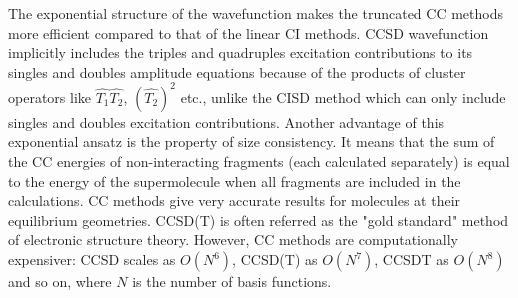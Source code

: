 The exponential structure of the wavefunction makes the truncated CC methods more efficient 
compared to that of the linear CI methods. CCSD wavefunction implicitly includes the triples
and quadruples excitation contributions to its singles and doubles amplitude equations because 
of the products of cluster operators like $\hat{T_1}\hat{T_2}$, ${(\hat{T_2})}^2$ etc., unlike 
the CISD method which can only include singles and doubles excitation contributions. 
Another advantage of this exponential ansatz is the property of size consistency\cite{Crawford00}.
It means that the sum of the CC energies of non-interacting fragments (each calculated 
separately) is equal to the energy of the supermolecule when all fragments are included 
in the calculations. CC methods give very accurate results for molecules at their equilibrium 
geometries\cite{Bartlett}. CCSD(T) is often referred as the "gold standard" method of electronic structure 
theory. 
However, CC methods are computationally expensiver: CCSD scales as $O(N^6)$, CCSD(T) as
$O(N^7)$, CCSDT as $O(N^8)$ and so on, where $N$ is the number of basis functions.\\\\
